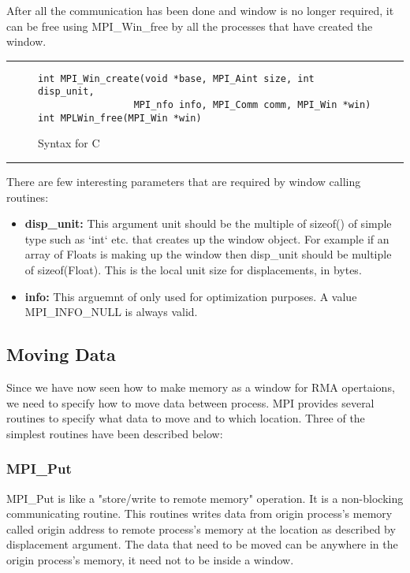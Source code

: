 \documentclass[12pt]{article}
\begin{document}
After all the communication has been done and window is no longer required, it can be free using {\ttfamily MPI\_Win\_free} by all the 
processes that have created the window.\\
\hrule
\begin{figure}[!ht]
\begin{verbatim}
int MPI_Win_create(void *base, MPI_Aint size, int disp_unit,
                 MPI_nfo info, MPI_Comm comm, MPI_Win *win)
int MPLWin_free(MPI_Win *win)
\end{verbatim}
\caption{Syntax for C}
\end{figure}
\hrule
\vspace{10pt}
There are few interesting parameters that are required by window calling routines:
\begin{itemize}
    \item \textbf{disp\_unit:} This argument unit should be the multiple of {\ttfamily sizeof()} of simple type such as `int` etc.
    that creates up the window object. For example if an array of {\ttfamily Floats} is making up the window then {\ttfamily disp\_unit}
    should be multiple of {\ttfamily sizeof(Float)}. This is the local unit size for displacements, in bytes.
    \item \textbf{info:} This arguemnt of only used for optimization purposes. A value {\ttfamily MPI\_INFO\_NULL} is always valid.
\end{itemize}

\subsection{Moving Data}
Since we have now seen how to make memory as a window for RMA opertaions, we need to specify how to move data between process.
MPI provides several routines to specify what data to move and to which location. Three of the simplest routines have been
described below:
\subsubsection{{\ttfamily MPI\_Put}}
{\ttfamily MPI\_Put} is like a "store/write to remote memory" operation. It is a non-blocking communicating routine. This routines 
writes data from {\ttfamily origin} process's memory called {\ttfamily origin address} to {\ttfamily remote} process's memory at
the location as described by {\ttfamily displacement} argument. The data that need to be moved can be anywhere in the {\ttfamily origin}
process's memory, it need not to be inside a window.
\end{document}
